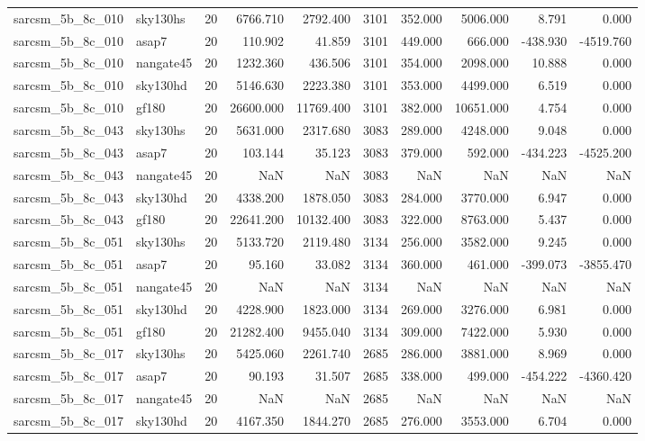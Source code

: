 \begin{tabular}{llrrrrrrrr}
sarcsm\_5b\_8c\_010 & sky130hs & 20 & 6766.710 & 2792.400 & 3101 & 352.000 & 5006.000 & 8.791 & 0.000 \\
sarcsm\_5b\_8c\_010 & asap7 & 20 & 110.902 & 41.859 & 3101 & 449.000 & 666.000 & -438.930 & -4519.760 \\
sarcsm\_5b\_8c\_010 & nangate45 & 20 & 1232.360 & 436.506 & 3101 & 354.000 & 2098.000 & 10.888 & 0.000 \\
sarcsm\_5b\_8c\_010 & sky130hd & 20 & 5146.630 & 2223.380 & 3101 & 353.000 & 4499.000 & 6.519 & 0.000 \\
sarcsm\_5b\_8c\_010 & gf180 & 20 & 26600.000 & 11769.400 & 3101 & 382.000 & 10651.000 & 4.754 & 0.000 \\
sarcsm\_5b\_8c\_043 & sky130hs & 20 & 5631.000 & 2317.680 & 3083 & 289.000 & 4248.000 & 9.048 & 0.000 \\
sarcsm\_5b\_8c\_043 & asap7 & 20 & 103.144 & 35.123 & 3083 & 379.000 & 592.000 & -434.223 & -4525.200 \\
sarcsm\_5b\_8c\_043 & nangate45 & 20 & NaN & NaN & 3083 & NaN & NaN & NaN & NaN \\
sarcsm\_5b\_8c\_043 & sky130hd & 20 & 4338.200 & 1878.050 & 3083 & 284.000 & 3770.000 & 6.947 & 0.000 \\
sarcsm\_5b\_8c\_043 & gf180 & 20 & 22641.200 & 10132.400 & 3083 & 322.000 & 8763.000 & 5.437 & 0.000 \\
sarcsm\_5b\_8c\_051 & sky130hs & 20 & 5133.720 & 2119.480 & 3134 & 256.000 & 3582.000 & 9.245 & 0.000 \\
sarcsm\_5b\_8c\_051 & asap7 & 20 & 95.160 & 33.082 & 3134 & 360.000 & 461.000 & -399.073 & -3855.470 \\
sarcsm\_5b\_8c\_051 & nangate45 & 20 & NaN & NaN & 3134 & NaN & NaN & NaN & NaN \\
sarcsm\_5b\_8c\_051 & sky130hd & 20 & 4228.900 & 1823.000 & 3134 & 269.000 & 3276.000 & 6.981 & 0.000 \\
sarcsm\_5b\_8c\_051 & gf180 & 20 & 21282.400 & 9455.040 & 3134 & 309.000 & 7422.000 & 5.930 & 0.000 \\
sarcsm\_5b\_8c\_017 & sky130hs & 20 & 5425.060 & 2261.740 & 2685 & 286.000 & 3881.000 & 8.969 & 0.000 \\
sarcsm\_5b\_8c\_017 & asap7 & 20 & 90.193 & 31.507 & 2685 & 338.000 & 499.000 & -454.222 & -4360.420 \\
sarcsm\_5b\_8c\_017 & nangate45 & 20 & NaN & NaN & 2685 & NaN & NaN & NaN & NaN \\
sarcsm\_5b\_8c\_017 & sky130hd & 20 & 4167.350 & 1844.270 & 2685 & 276.000 & 3553.000 & 6.704 & 0.000 \\

\end{tabular}
